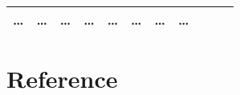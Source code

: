 \documentclass[
]{article}
\begin{document}
\begin{longtable}[]{@{}lllllllllll@{}}
\begin{minipage}[t]{0.09\columnwidth}
\ldots{}\strut
\end{minipage} & \begin{minipage}[t]{0.07\columnwidth}\raggedright
\ldots{}\strut
\end{minipage} & \begin{minipage}[t]{0.07\columnwidth}\raggedright
\ldots{}\strut
\end{minipage} & \begin{minipage}[t]{0.09\columnwidth}\raggedright
\ldots{}\strut
\end{minipage} & \begin{minipage}[t]{0.07\columnwidth}\raggedright
\ldots{}\strut
\end{minipage} & \begin{minipage}[t]{0.07\columnwidth}\raggedright
\ldots{}\strut
\end{minipage} & \begin{minipage}[t]{0.07\columnwidth}\raggedright
\ldots{}\strut
\end{minipage} & \begin{minipage}[t]{0.03\columnwidth}\raggedright
\ldots{}\strut
\end{minipage}\tabularnewline
\bottomrule
\end{longtable}

\hypertarget{bibliography}{%
\section*{Reference}\label{bibliography}}
\end{document}
